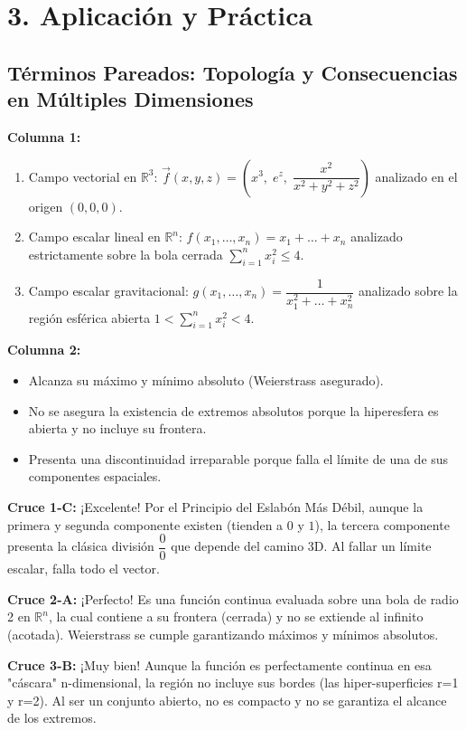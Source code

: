 \documentclass[11pt]{article}
\newenvironment{aplicacion}{%
  \section*{3. Aplicación y Práctica}%
}{}
\newenvironment{pareados}[1]{\subsection*{Términos Pareados: #1}}{\vspace{0.3cm}}
\newcommand{\columnaI}[1]{\textbf{Columna 1:}\begin{enumerate}#1\end{enumerate}}
\newcommand{\columnaII}[1]{\textbf{Columna 2:}\begin{itemize}#1\end{itemize}}
\newcommand{\pareo}[2]{\textbf{Cruce #1:} #2\par}
\begin{document}
\begin{aplicacion}
\begin{pareados}{Topología y Consecuencias en Múltiples Dimensiones}
    \columnaI{
      \item Campo vectorial en $\mathbb{R}^3$: $\vec{f}(x,y,z) = \left( x^3, \; e^z, \; \displaystyle \dfrac{x^2}{x^2+y^2+z^2} \right)$ analizado en el origen $(0,0,0)$.
      \item Campo escalar lineal en $\mathbb{R}^n$: $f(x_1, \dots, x_n) = x_1 + \dots + x_n$ analizado estrictamente sobre la bola cerrada $\displaystyle \sum_{i=1}^n x_i^2 \leq 4$.
      \item Campo escalar gravitacional: $g(x_1, \dots, x_n) = \displaystyle \dfrac{1}{x_1^2 + \dots + x_n^2}$ analizado sobre la región esférica abierta $1 < \displaystyle \sum_{i=1}^n x_i^2 < 4$.
    }
    
    \columnaII{
      \item Alcanza su máximo y mínimo absoluto (Weierstrass asegurado).
      \item No se asegura la existencia de extremos absolutos porque la hiperesfera es abierta y no incluye su frontera.
      \item Presenta una discontinuidad irreparable porque falla el límite de una de sus componentes espaciales.
    }

    \pareo{1-C}{¡Excelente! Por el Principio del Eslabón Más Débil, aunque la primera y segunda componente existen (tienden a $0$ y $1$), la tercera componente presenta la clásica división $\displaystyle \dfrac{0}{0}$ que depende del camino 3D. Al fallar un límite escalar, falla todo el vector.}
    \pareo{2-A}{¡Perfecto! Es una función continua evaluada sobre una bola de radio 2 en $\mathbb{R}^n$, la cual contiene a su frontera (cerrada) y no se extiende al infinito (acotada). Weierstrass se cumple garantizando máximos y mínimos absolutos.}
    \pareo{3-B}{¡Muy bien! Aunque la función es perfectamente continua en esa "cáscara" n-dimensional, la región no incluye sus bordes (las hiper-superficies r=1 y r=2). Al ser un conjunto abierto, no es compacto y no se garantiza el alcance de los extremos.}

  \end{pareados}

\end{aplicacion}
\end{document}
